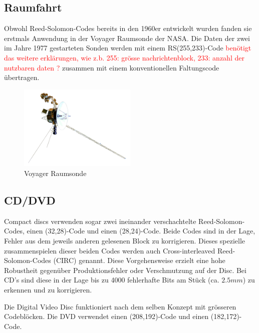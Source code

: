 \subsection{Raumfahrt}
Obwohl Reed-Solomon-Codes bereits in den 1960er entwickelt wurden fanden sie erstmals Anwendung in der Voyager Raumsonde der NASA. Die Daten der zwei im Jahre 1977 gestarteten Sonden werden mit einem RS(255,233)-Code \textcolor{red}{benötigt das weitere erklärungen, wie z.b. 255: grösse nachrichtenblock, 233: anzahl der nutzbaren daten ?} zusammen mit einem konventionellen Faltungscode übertragen. 

%
%
%

\begin{figure}
	\centering
	\includegraphics[width=0.5\textwidth]{papers/reedsolomon/images/Voyager_Sonde}
	\caption{Voyager Raumsonde}
	\label{fig:voyager}
\end{figure}

\subsection{CD/DVD}
Compact discs verwenden sogar zwei ineinander verschachtelte Reed-Solomon-Codes, einen (32,28)-Code und einen (28,24)-Code.
Beide Codes sind in der Lage, Fehler aus dem jeweils anderen gelesenen Block zu korrigieren. Dieses spezielle zusammenspielen dieser beiden Codes werden auch Cross-interleaved Reed-Solomon-Codes (CIRC) genannt.
Diese Vorgehensweise erzielt eine hohe Robustheit gegenüber Produktionsfehler oder Verschmutzung auf der Disc. Bei CD's sind diese in der Lage bis zu 4000 fehlerhafte Bits am Stück (ca. $2.5mm$) zu erkennen und zu korrigieren. 

Die Digital Video Disc funktioniert nach dem selben Konzept mit grösseren Codeblöcken. Die DVD verwendet einen (208,192)-Code und einen (182,172)-Code.

